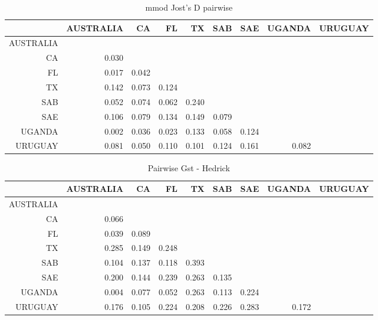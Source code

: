 \documentclass[a4paper]{scrartcl}\usepackage[]{graphicx}\usepackage[]{color}
\begin{document}
\begin{table}[ht]
\centering
\begin{tabular}{rrrrrrrrr}
  \hline
 & AUSTRALIA & CA & FL & TX & SAB & SAE & UGANDA & URUGUAY \\ 
  \hline
AUSTRALIA &  &  &  &  &  &  &  &  \\ 
  CA & 0.030 &  &  &  &  &  &  &  \\ 
  FL & 0.017 & 0.042 &  &  &  &  &  &  \\ 
  TX & 0.142 & 0.073 & 0.124 &  &  &  &  &  \\ 
  SAB & 0.052 & 0.074 & 0.062 & 0.240 &  &  &  &  \\ 
  SAE & 0.106 & 0.079 & 0.134 & 0.149 & 0.079 &  &  &  \\ 
  UGANDA & 0.002 & 0.036 & 0.023 & 0.133 & 0.058 & 0.124 &  &  \\ 
  URUGUAY & 0.081 & 0.050 & 0.110 & 0.101 & 0.124 & 0.161 & 0.082 &  \\ 
   \hline
\end{tabular}
\caption{mmod Jost's D pairwise} 
\end{table}
\begin{table}[ht]
\centering
\begin{tabular}{rrrrrrrrr}
  \hline
 & AUSTRALIA & CA & FL & TX & SAB & SAE & UGANDA & URUGUAY \\ 
  \hline
AUSTRALIA &  &  &  &  &  &  &  &  \\ 
  CA & 0.066 &  &  &  &  &  &  &  \\ 
  FL & 0.039 & 0.089 &  &  &  &  &  &  \\ 
  TX & 0.285 & 0.149 & 0.248 &  &  &  &  &  \\ 
  SAB & 0.104 & 0.137 & 0.118 & 0.393 &  &  &  &  \\ 
  SAE & 0.200 & 0.144 & 0.239 & 0.263 & 0.135 &  &  &  \\ 
  UGANDA & 0.004 & 0.077 & 0.052 & 0.263 & 0.113 & 0.224 &  &  \\ 
  URUGUAY & 0.176 & 0.105 & 0.224 & 0.208 & 0.226 & 0.283 & 0.172 &  \\ 
   \hline
\end{tabular}
\caption{Pairwise Gst - Hedrick} 
\end{table}
\end{document}
